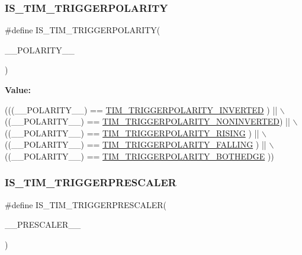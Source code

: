 \subsubsection{\texorpdfstring{I\+S\+\_\+\+T\+I\+M\+\_\+\+T\+R\+I\+G\+G\+E\+R\+P\+O\+L\+A\+R\+I\+TY}{IS\_TIM\_TRIGGERPOLARITY}}
{\footnotesize\ttfamily \#define I\+S\+\_\+\+T\+I\+M\+\_\+\+T\+R\+I\+G\+G\+E\+R\+P\+O\+L\+A\+R\+I\+TY(\begin{DoxyParamCaption}\item[{}]{\+\_\+\+\_\+\+P\+O\+L\+A\+R\+I\+T\+Y\+\_\+\+\_\+ }\end{DoxyParamCaption})}

{\bfseries Value\+:}
\begin{DoxyCode}
(((\_\_POLARITY\_\_) == \hyperlink{group___t_i_m___trigger___polarity_ga64337379c3762dca395b812c65656de4}{TIM\_TRIGGERPOLARITY\_INVERTED}   ) || \(\backslash\)
                                                ((\_\_POLARITY\_\_) == 
      \hyperlink{group___t_i_m___trigger___polarity_gad985881cdfddb63dfc52e6aaca776ff6}{TIM\_TRIGGERPOLARITY\_NONINVERTED}) || \(\backslash\)
                                                ((\_\_POLARITY\_\_) == 
      \hyperlink{group___t_i_m___trigger___polarity_ga64b521aa367d745ec00a763449634ace}{TIM\_TRIGGERPOLARITY\_RISING}     ) || \(\backslash\)
                                                ((\_\_POLARITY\_\_) == 
      \hyperlink{group___t_i_m___trigger___polarity_ga77df5988527ca829743dd57d2f867972}{TIM\_TRIGGERPOLARITY\_FALLING}    ) || \(\backslash\)
                                                ((\_\_POLARITY\_\_) == 
      \hyperlink{group___t_i_m___trigger___polarity_gaa72eb9fd278575ff05aa3dd1c173dcc8}{TIM\_TRIGGERPOLARITY\_BOTHEDGE}   ))
\end{DoxyCode}
\mbox{\label{group___t_i_m___private___macros_gac38c7d0c59f17b5a6d9ff01b82ddae43}} 
\subsubsection{\texorpdfstring{I\+S\+\_\+\+T\+I\+M\+\_\+\+T\+R\+I\+G\+G\+E\+R\+P\+R\+E\+S\+C\+A\+L\+ER}{IS\_TIM\_TRIGGERPRESCALER}}
{\footnotesize\ttfamily \#define I\+S\+\_\+\+T\+I\+M\+\_\+\+T\+R\+I\+G\+G\+E\+R\+P\+R\+E\+S\+C\+A\+L\+ER(\begin{DoxyParamCaption}\item[{}]{\+\_\+\+\_\+\+P\+R\+E\+S\+C\+A\+L\+E\+R\+\_\+\+\_\+ }\end{DoxyParamCaption})}

